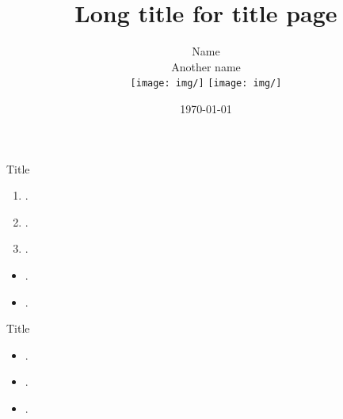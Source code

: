 \documentclass[aspectratio=1610,pdftex,dvipsnames,compress]{beamer}
\title[Short title for footer]{Long title for title page}
\author[Short author for footer]{
    Name\\
    \vspace{0.25in}
    Another name\\
    \vspace{0.05in}
    \texttt{[image: img/]} 
    \texttt{[image: img/]}
}
\institute[Short institute for footer]{
    \vspace{0.05in}
    Institution\\
    Subtitle\\
    \vspace{0.10in}
    Subtitle\\
    \vspace{0.15in}
    \texttt{[image: logo]}
    }
\date{\today}
\newcommand\blfootnote[1]{%
  \begingroup
  \renewcommand\thefootnote{}\footnote{#1}%
  \addtocounter{footnote}{-1}%
  \endgroup
}
\begin{document}
\nobibliography* %

{
    \begin{frame}
        \titlepage
    \end{frame}
} 


\begin{frame}{Title}
    \begin{enumerate}[label=(\arabic*),leftmargin=*,itemsep=7pt]
        \item .
        \item .
        \item .
    \end{enumerate}
    \vspace{0.25in}
    \begin{itemize}[leftmargin=*,itemsep=7pt]
        \item .
        \item . 
    \end{itemize}
\end{frame}


\begin{frame}{Title}
    \begin{itemize}[leftmargin=*,itemsep=7pt]
        \item .  
        \item .
        \item .
    \end{itemize}
\end{frame}


%
%


\end{document}
